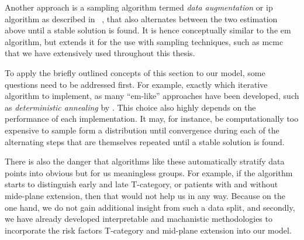 \documentclass[\relativeRoot/main.tex]{subfiles}
\begin{document}
Another approach is a sampling algorithm termed \emph{data augmentation} or \gls{ip} algorithm as described in \citeauthor*{bishop_pattern_2006}~\cite[537]{bishop_pattern_2006}, that also alternates between the two estimation above until a stable solution is found. It is hence conceptually similar to the \gls{em} algorithm, but extends it for the use with sampling techniques, such as \gls{mcmc} that we have extensively used throughout this thesis.

To apply the briefly outlined concepts of this section to our model, some questions need to be addressed first. For example, exactly which iterative algorithm to implement, as many ``\gls{em}-like'' approaches have been developed, such as \emph{deterministic annealing} by . This choice also highly depends on the performance of each implementation. It may, for instance, be computationally too expensive to sample form a distribution until convergence during each of the alternating steps that are themselves repeated until a stable solution is found.

There is also the danger that algorithms like these automatically stratify data points into obvious but for us meaningless groups. For example, if the algorithm starts to distinguish early and late T-category, or patients with and without mide-plane extension, then that would not help us in any way. Because on the one hand, we do not gain additional insight from such a data split, and secondly, we have already developed interpretable and machanistic methodologies to incorporate the risk factors T-category and mid-plane extension into our model.
\end{document}
